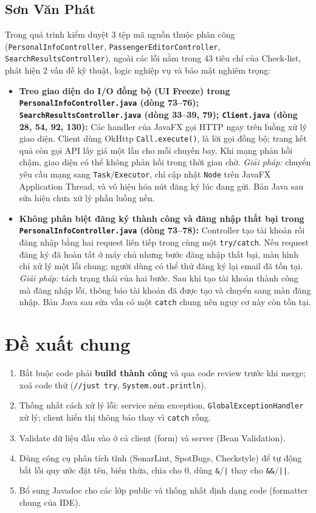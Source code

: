 \documentclass[12pt,a4paper]{article}
\begin{document}
\subsection{Sơn Văn Phát}
Trong quá trình kiểm duyệt 3 tệp mã nguồn thuộc phân công (\texttt{PersonalInfoController}, \texttt{PassengerEditorController}, \texttt{SearchResultsController}), ngoài các lỗi nằm trong 43 tiêu chí của Check-list, phát hiện 2 vấn đề kỹ thuật, logic nghiệp vụ và bảo mật nghiêm trọng:
\begin{itemize}
  \item \textbf{Treo giao diện do I/O đồng bộ (UI Freeze) trong \texttt{PersonalInfoController.java} (dòng 73--76); \texttt{SearchResultsController.java} (dòng 33--39, 79); \texttt{Client.java} (dòng 28, 54, 92, 130):} Các handler của JavaFX gọi HTTP ngay trên luồng xử lý giao diện. Client dùng OkHttp \texttt{Call.execute()}, là lời gọi đồng bộ; trang kết quả còn gọi API lấy giá một lần cho mỗi chuyến bay. Khi mạng phản hồi chậm, giao diện có thể không phản hồi trong thời gian chờ. \textit{Giải pháp:} chuyển yêu cầu mạng sang \texttt{Task}/\texttt{Executor}, chỉ cập nhật \texttt{Node} trên JavaFX Application Thread, và vô hiệu hóa nút đăng ký lúc đang gửi. Bản Java sau sửa hiện chưa xử lý phần luồng nền.
  \item \textbf{Không phân biệt đăng ký thành công và đăng nhập thất bại trong \texttt{PersonalInfoController.java} (dòng 73--78):} Controller tạo tài khoản rồi đăng nhập bằng hai request liên tiếp trong cùng một \texttt{try/catch}. Nếu request đăng ký đã hoàn tất ở máy chủ nhưng bước đăng nhập thất bại, màn hình chỉ xử lý một lỗi chung; người dùng có thể thử đăng ký lại email đã tồn tại. \textit{Giải pháp:} tách trạng thái của hai bước. Sau khi tạo tài khoản thành công mà đăng nhập lỗi, thông báo tài khoản đã được tạo và chuyển sang màn đăng nhập. Bản Java sau sửa vẫn có một \texttt{catch} chung nên nguy cơ này còn tồn tại.
\end{itemize}

\section{Đề xuất chung}
\begin{enumerate}[noitemsep]
  \item Bắt buộc code phải \textbf{build thành công} và qua code review trước khi merge; xoá code thử (\texttt{//just try}, \texttt{System.out.println}).
  \item Thống nhất cách xử lý lỗi: service ném exception, \texttt{GlobalExceptionHandler} xử lý; client hiển thị thông báo thay vì \texttt{catch} rỗng.
  \item Validate dữ liệu đầu vào ở cả client (form) và server (Bean Validation).
  \item Dùng công cụ phân tích tĩnh (SonarLint, SpotBugs, Checkstyle) để tự động bắt lỗi quy ước đặt tên, biến thừa, chia cho 0, dùng \texttt{\&}/\texttt{|} thay cho \texttt{\&\&}/\texttt{||}.
  \item Bổ sung Javadoc cho các lớp public và thống nhất định dạng code (formatter chung của IDE).
\end{enumerate}
\end{document}
